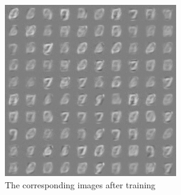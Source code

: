 \documentclass{elegantbook}
\begin{document}
\begin{figure}[!h]
	\centering
	\includegraphics[width=0.8\linewidth]{../results/vae3_gaussian_epoch_10.png}
	\caption{\label{res5}The corresponding images after training}
\end{figure}
\end{document}

